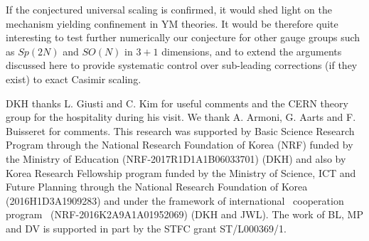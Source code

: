 \documentclass[prl,aps,
showpacs,
preprint,
nofootinbib,
floatfix,
superscriptaddress, showkeys
]{revtex4-1}
\begin{document}
If the conjectured universal scaling is confirmed, it would
shed light on the mechanism yielding confinement in YM theories. 
It would be therefore quite interesting  to test further numerically our conjecture
for other gauge groups such as $Sp(2N)$ and ${SO}(N)$ in $3+1$ dimensions,
and to extend the arguments discussed here to provide systematic control over
sub-leading corrections (if they exist) to exact Casimir scaling.




\acknowledgments
DKH thanks L. Giusti and C. Kim for useful comments and the CERN theory group for the hospitality during his visit. We thank  A. Armoni, G. Aarts and F. Buisseret for comments. 
This research was supported by Basic Science Research Program through the National Research Foundation of Korea (NRF) funded by the Ministry of Education (NRF-2017R1D1A1B06033701) (DKH) and also by Korea Research Fellowship program funded by the Ministry of Science, ICT and Future Planning through the National Research Foundation of Korea (2016H1D3A1909283) and under the framework of international  cooperation program  (NRF-2016K2A9A1A01952069) (DKH and JWL).
The work of BL, MP and DV is supported in part  by the STFC grant ST/L000369/1.
\end{document}
